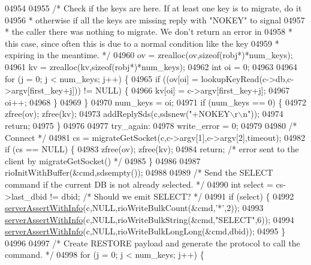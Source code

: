 \begin{DoxyCode}
{{{{{{{{{{{{{{{{{{{{{{{{{{{{{{{{{{{{{{{{{{{{{{{{{{{{{{{{{{{{{{{{{{{{{{{{{{{{{{{{{{{{{{{{{{{{{{{{{{{{{{{{{{{04954 
04955     \textcolor{comment}{/* Check if the keys are here. If at least one key is to migrate, do it}
04956 \textcolor{comment}{     * otherwise if all the keys are missing reply with "NOKEY" to signal}
04957 \textcolor{comment}{     * the caller there was nothing to migrate. We don't return an error in}
04958 \textcolor{comment}{     * this case, since often this is due to a normal condition like the key}
04959 \textcolor{comment}{     * expiring in the meantime. */}
04960     ov = zrealloc(ov,\textcolor{keyword}{sizeof}(robj*)*num\_keys);
04961     kv = zrealloc(kv,\textcolor{keyword}{sizeof}(robj*)*num\_keys);
04962     \textcolor{keywordtype}{int} oi = 0;
04963 
04964     \textcolor{keywordflow}{for} (j = 0; j < num\_keys; j++) \{
04965         \textcolor{keywordflow}{if} ((ov[oi] = lookupKeyRead(c->db,c->argv[first\_key+j])) != NULL) \{
04966             kv[oi] = c->argv[first\_key+j];
04967             oi++;
04968         \}
04969     \}
04970     num\_keys = oi;
04971     \textcolor{keywordflow}{if} (num\_keys == 0) \{
04972         zfree(ov); zfree(kv);
04973         addReplySds(c,sdsnew(\textcolor{stringliteral}{"+NOKEY\(\backslash\)r\(\backslash\)n"}));
04974         \textcolor{keywordflow}{return};
04975     \}
04976 
04977 try\_again:
04978     write\_error = 0;
04979 
04980     \textcolor{comment}{/* Connect */}
04981     cs = migrateGetSocket(c,c->argv[1],c->argv[2],timeout);
04982     \textcolor{keywordflow}{if} (cs == NULL) \{
04983         zfree(ov); zfree(kv);
04984         \textcolor{keywordflow}{return}; \textcolor{comment}{/* error sent to the client by migrateGetSocket() */}
04985     \}
04986 
04987     rioInitWithBuffer(&cmd,sdsempty());
04988 
04989     \textcolor{comment}{/* Send the SELECT command if the current DB is not already selected. */}
04990     \textcolor{keywordtype}{int} select = cs->last\_dbid != dbid; \textcolor{comment}{/* Should we emit SELECT? */}
04991     \textcolor{keywordflow}{if} (select) \{
04992         \hyperlink{server_8h_a7308f76cbff9a8d3797fe78190b91282}{serverAssertWithInfo}(c,NULL,rioWriteBulkCount(&cmd,\textcolor{stringliteral}{'*'},2));
04993         \hyperlink{server_8h_a7308f76cbff9a8d3797fe78190b91282}{serverAssertWithInfo}(c,NULL,rioWriteBulkString(&cmd,\textcolor{stringliteral}{"SELECT"},6));
04994         \hyperlink{server_8h_a7308f76cbff9a8d3797fe78190b91282}{serverAssertWithInfo}(c,NULL,rioWriteBulkLongLong(&cmd,dbid));
04995     \}
04996 
04997     \textcolor{comment}{/* Create RESTORE payload and generate the protocol to call the command. */}
04998     \textcolor{keywordflow}{for} (j = 0; j < num\_keys; j++) \{
}}}}}}}}}}}}}}}}}}}}}}}}}}}}}}}}}}}}}}}}}}}}}}}}}}}}}}}}}}}}}}}}}}}}}}}}}}}}}}}}}}}}}}}}}}}}}}}}}}}}}}}}}}}
\end{DoxyCode}
